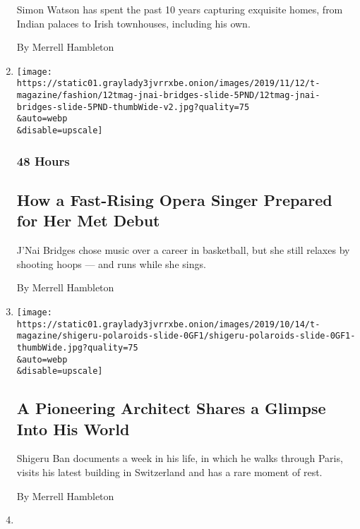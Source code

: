 \begin{enumerate}
  Simon Watson has spent the past 10 years capturing exquisite homes,
  from Indian palaces to Irish townhouses, including his own.

  By Merrell Hambleton
\item
  \href{/2019/11/13/t-magazine/jnai-bridges.html}{}

  \texttt{[image: https://static01.graylady3jvrrxbe.onion/images/2019/11/12/t-magazine/fashion/12tmag-jnai-bridges-slide-5PND/12tmag-jnai-bridges-slide-5PND-thumbWide-v2.jpg?quality=75\\\&auto=webp\\\&disable=upscale]}

  \hypertarget{48-hours}{%
  \subsubsection{48 Hours}\label{48-hours}}

  \hypertarget{how-a-fast-rising-opera-singer-prepared-for-her-met-debut}{%
  \subsection{How a Fast-Rising Opera Singer Prepared for Her Met
  Debut}\label{how-a-fast-rising-opera-singer-prepared-for-her-met-debut}}

  J'Nai Bridges chose music over a career in basketball, but she still
  relaxes by shooting hoops --- and runs while she sings.

  By Merrell Hambleton
\item
  \href{/2019/10/18/t-magazine/shigeru-ban-photos.html}{}

  \texttt{[image: https://static01.graylady3jvrrxbe.onion/images/2019/10/14/t-magazine/shigeru-polaroids-slide-0GF1/shigeru-polaroids-slide-0GF1-thumbWide.jpg?quality=75\\\&auto=webp\\\&disable=upscale]}

  \hypertarget{a-pioneering-architect-shares-a-glimpse-into-his-world}{%
  \subsection{A Pioneering Architect Shares a Glimpse Into His
  World}\label{a-pioneering-architect-shares-a-glimpse-into-his-world}}

  Shigeru Ban documents a week in his life, in which he walks through
  Paris, visits his latest building in Switzerland and has a rare moment
  of rest.

  By Merrell Hambleton
\item
  \href{/2019/10/17/t-magazine/t-greats-party.html}{}


\end{enumerate}
